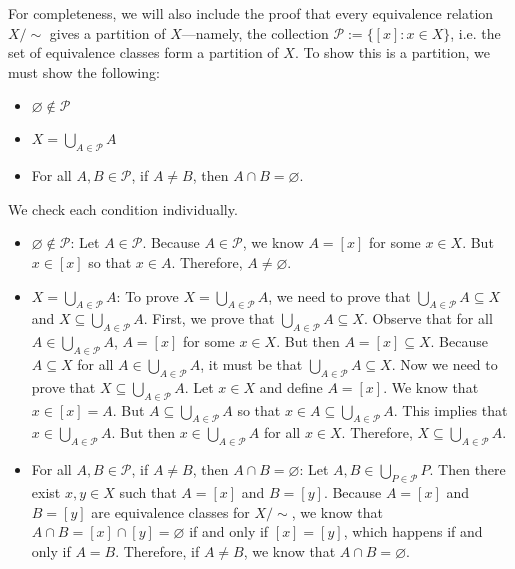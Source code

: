 \documentclass[11pt,letterpaper]{article}
\begin{document}
For completeness, we will also include the proof that every equivalence relation $X/\sim$ gives a partition of $X$---namely, the collection $\mathcal{P}:= \{ [x] \colon x \in X \}$, i.e. the set of equivalence classes form a partition of $X$. To show this is a partition, we must show the following:
	\begin{itemize} \itemsep= 0ex
	\item $\varnothing \notin \mathcal{P}$
	\item $X= \bigcup_{A \in \mathcal{P}} A$
	\item For all $A, B \in \mathcal{P}$, if $A \neq B$, then $A \cap B= \varnothing$. 
	\end{itemize}
We check each condition individually.
	\begin{itemize}
	\item $\varnothing \notin \mathcal{P}$: Let $A \in \mathcal{P}$. Because $A \in \mathcal{P}$, we know $A= [x]$ for some $x \in X$. But $x \in [x]$ so that $x \in A$. Therefore, $A \neq \varnothing$. 
	\item $X= \bigcup_{A \in \mathcal{P}} A$: To prove $X= \bigcup_{A \in \mathcal{P}} A$, we need to prove that $\bigcup_{A \in \mathcal{P}} A \subseteq X$ and $X \subseteq \bigcup_{A \in \mathcal{P}} A$. First, we prove that $\bigcup_{A \in \mathcal{P}} A \subseteq X$. Observe that for all $A \in \bigcup_{A \in \mathcal{P}} A$, $A= [x]$ for some $x \in X$. But then $A= [x] \subseteq X$. Because $A \subseteq X$ for all $A \in \bigcup_{A \in \mathcal{P}} A$, it must be that $\bigcup_{A \in \mathcal{P}} A \subseteq X$. Now we need to prove that $X \subseteq \bigcup_{A \in \mathcal{P}} A$. Let $x \in X$ and define $A= [x]$. We know that $x \in [x]= A$. But $A \subseteq \bigcup_{A \in \mathcal{P}} A$ so that $x \in A \subseteq \bigcup_{A \in \mathcal{P}} A$. This implies that $x \in \bigcup_{A \in \mathcal{P}} A$. But then $x \in \bigcup_{A \in \mathcal{P}} A$ for all $x \in X$. Therefore, $X \subseteq \bigcup_{A \in \mathcal{P}} A$. 
	\item For all $A, B \in \mathcal{P}$, if $A \neq B$, then $A \cap B= \varnothing$: Let $A, B \in \bigcup_{P \in \mathcal{P}} P$. Then there exist $x, y \in X$ such that $A= [x]$ and $B= [y]$. Because $A= [x]$ and $B= [y]$ are equivalence classes for $X/\sim$, we know that $A \cap B= [x] \cap [y]= \varnothing$ if and only if $[x]= [y]$, which happens if and only if $A= B$. Therefore, if $A \neq B$, we know that $A \cap B= \varnothing$.
	\end{itemize}
\end{document}

